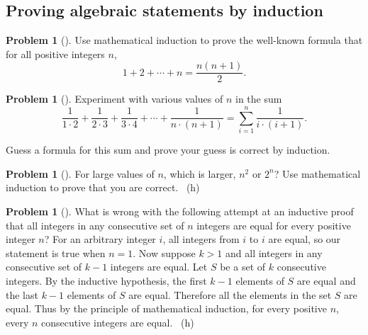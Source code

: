 \documentclass[10pt,]{book}
\theoremstyle{plain}
\theoremstyle{definition}
\newtheorem{activity}[project]{Problem}
\theoremstyle{definition}
\numberwithin{equation}{chapter}
\begin{document}
\subsection[{Proving algebraic statements by induction}]{Proving algebraic statements by induction}\label{subsection-75}
\begin{activity}[]\marginsymbol[-1em]{} \label{activity-363}
\hypertarget{p-2002}{}%
Use mathematical induction to prove the well-known formula that for all positive integers \(n\),%
\begin{equation*}
1+2 + \cdots +n = \frac{n(n+1)}{2}.
\end{equation*}
%
\end{activity}
\begin{activity}[]\marginsymbol[-1em]{} \label{activity-364}
\hypertarget{p-2005}{}%
Experiment with various values of \(n\) in the sum%
\begin{equation*}
\frac{1}{1\cdot2}+\frac{1}{2\cdot3} + \frac{1}{3\cdot
4}+\cdots+\frac{1}{n\cdot (n+1)} = \sum_{i=1}^n \frac{1}{i\cdot(i+1)}.
\end{equation*}
%
\par
\hypertarget{p-2006}{}%
Guess a formula for this sum and prove your guess is correct by induction.%
\end{activity}
\begin{activity}[]\marginsymbol[-1em]{} \label{activity-365}
\hypertarget{p-2011}{}%
For large values of \(n\), which is larger, \(n^2\) or \(2^n\)? Use mathematical induction to prove that you are correct.%
~{\tiny (h)}\end{activity}
\begin{activity}[]\marginsymbol[-1em]{} \label{activity-366}
\hypertarget{p-2015}{}%
What is wrong with the following attempt at an inductive proof that all integers in any consecutive set of \(n\) integers are equal for every positive integer \(n\)? For an arbitrary integer \(i\), all integers from \(i\) to \(i\) are equal, so our statement is true when \(n=1\). Now suppose \(k>1\) and all integers in any consecutive set of \(k-1\) integers are equal. Let \(S\) be a set of \(k\) consecutive integers. By the inductive hypothesis, the first \(k-1\) elements of \(S\) are equal and the last \(k-1\) elements of \(S\) are equal. Therefore all the elements in the set \(S\) are equal. Thus by the principle of mathematical induction, for every positive \(n\), every \(n\) consecutive integers are equal.%
~{\tiny (h)}\end{activity}
\typeout{************************************************}
\typeout{************************************************}
\end{document}
